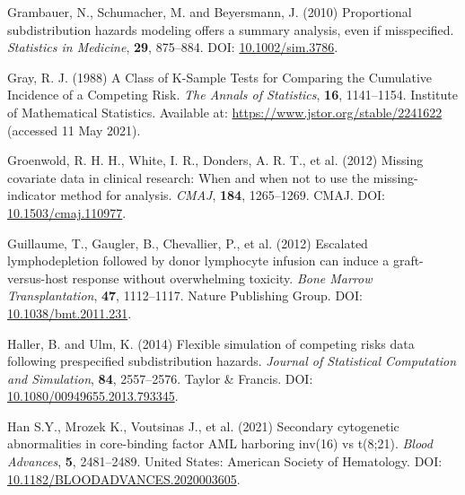 \documentclass[
  letterpaper,
  DIV=11,
  numbers=noendperiod]{scrreprt}
\newlength{\cslhangindent}
\newlength{\cslentryspacingunit} %
\newenvironment{CSLReferences}[2] %
 {%
  \setlength{\parindent}{0pt}
  \ifodd #1
  \let\oldpar\par
  \def\par{\hangindent=\cslhangindent\oldpar}
  \fi
  \setlength{\parskip}{#2\cslentryspacingunit}
 }%
 {}
\begin{document}
\begin{CSLReferences}{1}{0}
\leavevmode{}%
Grambauer, N., Schumacher, M. and Beyersmann, J. (2010) Proportional
subdistribution hazards modeling offers a summary analysis, even if
misspecified. \emph{Statistics in Medicine}, \textbf{29}, 875--884. DOI:
\href{https://doi.org/10.1002/sim.3786}{10.1002/sim.3786}.

\leavevmode{}%
Gray, R. J. (1988) A {Class} of {K-Sample Tests} for {Comparing} the
{Cumulative Incidence} of a {Competing Risk}. \emph{The Annals of
Statistics}, \textbf{16}, 1141--1154. Institute of Mathematical
Statistics. Available at: \url{https://www.jstor.org/stable/2241622}
(accessed 11 May 2021).

\leavevmode{}%
Groenwold, R. H. H., White, I. R., Donders, A. R. T., et al. (2012)
Missing covariate data in clinical research: When and when not to use
the missing-indicator method for analysis. \emph{CMAJ}, \textbf{184},
1265--1269. CMAJ. DOI:
\href{https://doi.org/10.1503/cmaj.110977}{10.1503/cmaj.110977}.

\leavevmode{}%
Guillaume, T., Gaugler, B., Chevallier, P., et al. (2012) Escalated
lymphodepletion followed by donor lymphocyte infusion can induce a
graft-versus-host response without overwhelming toxicity. \emph{Bone
Marrow Transplantation}, \textbf{47}, 1112--1117. Nature Publishing
Group. DOI:
\href{https://doi.org/10.1038/bmt.2011.231}{10.1038/bmt.2011.231}.

\leavevmode{}%
Haller, B. and Ulm, K. (2014) Flexible simulation of competing risks
data following prespecified subdistribution hazards. \emph{Journal of
Statistical Computation and Simulation}, \textbf{84}, 2557--2576. Taylor
\& Francis. DOI:
\href{https://doi.org/10.1080/00949655.2013.793345}{10.1080/00949655.2013.793345}.

\leavevmode{}%
Han S.Y., Mrozek K., Voutsinas J., et al. (2021) Secondary cytogenetic
abnormalities in core-binding factor {AML} harboring inv(16) vs t(8;21).
\emph{Blood Advances}, \textbf{5}, 2481--2489. United States: American
Society of Hematology. DOI:
\href{https://doi.org/10.1182/BLOODADVANCES.2020003605}{10.1182/BLOODADVANCES.2020003605}.


\end{CSLReferences}
\end{document}
